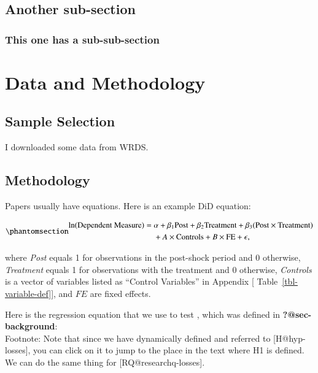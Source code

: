 \documentclass[
  authoryear,
  preprint]{elsarticle}
\begin{document}
\subsection{Another sub-section}\label{sec:another}

\subsubsection{This one has a sub-sub-section}\label{sec:another-sub}

\section{Data and Methodology}\label{section-method}

\subsection{Sample Selection}\label{sample-selection}

I downloaded some data from WRDS.

\subsection{Methodology}\label{methodology}

Papers usually have equations. Here is an example DiD equation:

\begin{equation}\phantomsection\label{eq-did}{
\begin{aligned}
    \ln(\text{Dependent Measure}) = {} & \alpha + \beta_1 \text{Post} + \beta_2 \text{Treatment} + \beta_3 (\text{Post} \times \text{Treatment}) \\
    & + A \times \text{Controls} + B \times \text{FE} + \epsilon,
\end{aligned}
}\end{equation}

where \emph{Post} equals 1 for observations in the post-shock period and
0 otherwise, \emph{Treatment} equals 1 for observations with the
treatment and 0 otherwise, \emph{Controls} is a vector of variables
listed as ``Control Variables'' in Appendix {[}
Table~\ref{tbl-variable-def}{]}, and \(FE\) are fixed effects.

Here is the regression equation that we use to test \citep{hypo}, which
was defined in \textbf{?@sec-background}:\\
Footnote: Note that since we have dynamically defined and referred to
{[}H@hyp-losses{]}, you can click on it to jump to the place in the text
where H1 is defined. We can do the same thing for
{[}RQ@researchq-losses{]}.
\end{document}
